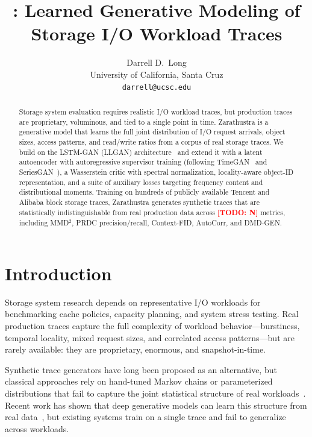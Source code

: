 \documentclass[10pt,twocolumn]{article}
\title{\textbf{\sys: Learned Generative Modeling of\\Storage I/O Workload Traces}}
\author{
  Darrell D.\ Long \\
  University of California, Santa Cruz \\
  \texttt{darrell@ucsc.edu}
  \and
  \todo{co-authors}
}
\date{}
\newcommand{\sys}{Zarathustra\xspace}
\newcommand{\todo}[1]{\textcolor{red}{\textbf{[TODO: #1]}}}
\begin{document}
\maketitle

\begin{abstract}
Storage system evaluation requires realistic I/O workload traces, but
production traces are proprietary, voluminous, and tied to a single
point in time.  \sys is a generative model that learns the full joint
distribution of I/O request arrivals, object sizes, access patterns,
and read/write ratios from a corpus of real storage traces.  We build
on the LSTM-GAN (LLGAN) architecture~\cite{zhang2024llgan} and extend
it with a latent autoencoder with autoregressive supervisor training
(following TimeGAN~\cite{yoon2019timegan} and SeriesGAN~\cite{seriesgan2024}),
a Wasserstein critic with spectral normalization, locality-aware
object-ID representation, and a suite of auxiliary losses targeting
frequency content and distributional moments.  Training on hundreds
of publicly available Tencent and Alibaba block storage traces, \sys
generates synthetic traces that are statistically indistinguishable
from real production data across \todo{N} metrics, including
MMD$^2$, PRDC precision/recall, Context-FID, AutoCorr, and DMD-GEN.

\end{abstract}


\section{Introduction}
\label{sec:intro}

Storage system research depends on representative I/O workloads for
benchmarking cache policies, capacity planning, and system stress
testing.  Real production traces capture the full complexity of
workload behavior---burstiness, temporal locality, mixed request sizes,
and correlated access patterns---but are rarely available: they are
proprietary, enormous, and snapshot-in-time.

Synthetic trace generators have long been proposed as an alternative,
but classical approaches rely on hand-tuned Markov chains or
parameterized distributions that fail to capture the joint statistical
structure of real workloads~\cite{paul2022hpc,geminio2024}.  Recent
work has shown that deep generative models can learn this structure
from real data~\cite{zhang2024llgan}, but existing systems train on a
single trace and fail to generalize across workloads.
\end{document}
